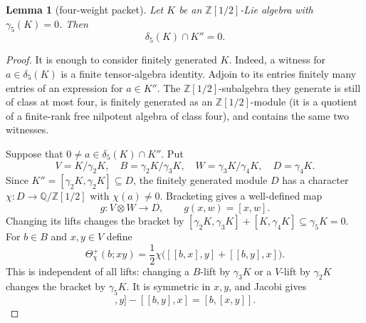 \documentclass[10pt,a4paper]{amsart}
\newtheorem{lemma}[theorem]{Lemma}
\theoremstyle{remark}
\newcommand{\R}{\mathbb Z[1/2]}
\newcommand{\E}{\mathbb Q/\mathbb Z[1/2]}
\newcommand{\dlt}{\delta}
\newcommand{\gm}{\gamma}
\begin{document}
\begin{lemma}[four-weight packet]\label{lem:packet}
Let $K$ be an $\R$-Lie algebra with $\gm_5(K)=0$.  Then
\[
                         \dlt_5(K)\cap K''=0.
\]
\end{lemma}

\begin{proof}
It is enough to consider finitely generated $K$.  Indeed, a witness
for $a\in\delta_5(K)$ is a finite tensor-algebra identity.  Adjoin to
its entries finitely many entries of an expression for $a\in K''$.
The $\R$-subalgebra they generate is still of class at most four, is
finitely generated as an $\R$-module (it is a quotient of a
finite-rank free nilpotent algebra of class four), and contains the
same two witnesses.

Suppose that $0\ne a\in\delta_5(K)\cap K''$.  Put
\[
 V=K/\gm_2K,\quad B=\gm_2K/\gm_3K,\quad
 W=\gm_3K/\gm_4K,\quad D=\gm_4K.
\]
Since $K''=[\gamma_2K,\gamma_2K]\subseteq D$, the finitely generated
module $D$ has a character
$\chi:D\to\E$ with $\chi(a)\ne0$.  Bracketing gives a well-defined map
\begin{equation}
                 g:V\otimes W\longrightarrow D,
                 \qquad g(x,w)=[x,w].                  \label{eq:g}
\end{equation}
Changing its lifts changes the bracket by
$[\gamma_2K,\gamma_3K]+[K,\gamma_4K]\subseteq\gamma_5K=0$.
For $b\in B$ and $x,y\in V$ define
\begin{equation}
 \Theta^+_\chi(b;xy)=\frac12\chi
 \bigl([[b,x],y]+[[b,y],x]\bigr).                     \label{eq:theta}
\end{equation}
This is independent of all lifts: changing a $B$-lift by $\gamma_3K$
or a $V$-lift by $\gamma_2K$ changes the bracket by $\gamma_5K$.
It is symmetric in $x,y$, and Jacobi gives
\begin{equation}
 [[b,x],y]-[[b,y],x]=[b,[x,y]].                         \label{eq:jacobi}
\end{equation}


\end{proof}
\end{document}
